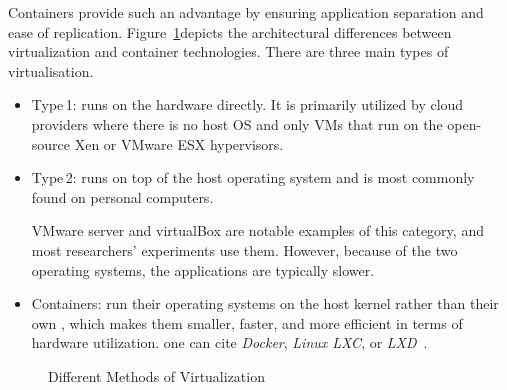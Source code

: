 Containers provide such an advantage by ensuring application separation and ease of replication.
Figure~\ref{environement:virtualization_technique}depicts the architectural differences between virtualization and container technologies. There are three main types of virtualisation.
\begin{itemize}
    \item \textsf{Type\,1}: runs on the hardware directly.
          It is primarily utilized by cloud providers where there is no host OS and only VMs that run on the open-source Xen or VMware ESX hypervisors.

    \item \textsf{Type\,2}: runs on top of the host operating system and is most commonly found on personal computers.

          VMware server and virtualBox are notable examples of this category, and most researchers' experiments use them.
          However, because of the two operating systems, the applications are typically slower.

    \item \textsf{Containers}: run their operating systems on the host kernel rather than their own , which makes them smaller, faster, and more efficient in terms of hardware utilization.
          one can cite \emph{Docker}, \emph{Linux LXC}, or \emph{LXD}~\cite{abuabdo_virtualization_2019}.
\end{itemize}


\begin{figure}
    \caption{Different Methods of Virtualization}\label{environement:virtualization_technique}
\end{figure}


